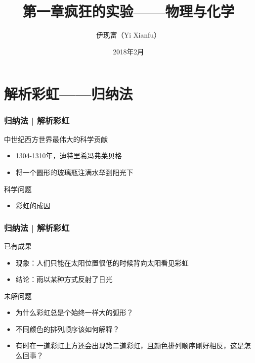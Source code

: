 



\title[物理与化学]{第一章\quad 疯狂的实验——物理与化学}
\author[Yixf]{伊现富（Yi Xianfu）}
\date{2018年2月}



\section{解析彩虹——归纳法}
\begin{frame}
  \frametitle{归纳法 | 解析彩虹}
  \begin{block}{中世纪西方世界最伟大的科学贡献}
    \begin{itemize}
      \item 1304-1310年，迪特里希\textbullet 冯\textbullet 弗莱贝格
      \item 将一个圆形的玻璃瓶注满水举到阳光下
    \end{itemize}
  \end{block}
  \pause
  \begin{block}{科学问题}
    \begin{itemize}
      \item 彩虹的成因
    \end{itemize}
    \vspace{-1em}
    \begin{figure}
      \centering
    \end{figure}
  \end{block}
\end{frame}

\begin{frame}
  \frametitle{归纳法 | 解析彩虹}
  \begin{block}{已有成果}
    \begin{itemize}
      \item 现象：人们只能在太阳位置很低的时候背向太阳看见彩虹
      \item 结论：雨以某种方式反射了日光
    \end{itemize}
  \end{block}
  \pause
  \begin{block}{未解问题}
    \begin{itemize}
      \item 为什么彩虹总是个始终一样大的弧形？
      \item 不同颜色的排列顺序该如何解释？
      \item 有时在一道彩虹上方还会出现第二道彩虹，且颜色排列顺序刚好相反，这是怎么回事？
    \end{itemize}
  \end{block}
\end{frame}

